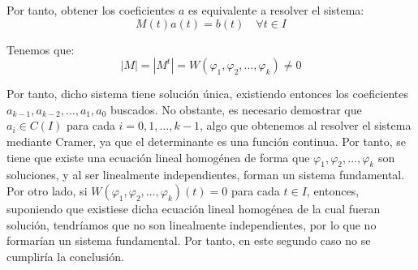 \begin{ejercicio}
    Por tanto, obtener los coeficientes $a$ es equivalente a resolver el sistema:
    \begin{equation*}
        M(t)a(t)=b(t) \quad \forall t\in I
    \end{equation*}

    Tenemos que:
    \begin{equation*}
        |M|=|M^t|=W(\varphi_1,\varphi_2,\ldots,\varphi_k)\neq 0
    \end{equation*}

    Por tanto, dicho sistema tiene solución única, existiendo entonces los coeficientes $a_{k-1},a_{k-2},\ldots,a_1,a_0$ buscados.
    No obstante, es necesario demostrar que $a_i\in C(I)$ para cada $i=0,1,\ldots,k-1$, algo que obtenemos al resolver el sistema mediante Cramer, ya que el determinante es una función continua.
    Por tanto, se tiene que existe una ecuación lineal homogénea de forma que $\varphi_1, \varphi_2, \ldots, \varphi_k$ son soluciones, y al ser linealmente independientes, forman un sistema fundamental.\\

    Por otro lado, si $W(\varphi_1, \varphi_2, \ldots, \varphi_k)(t) = 0$ para cada $t \in I$, entonces, suponiendo que existiese dicha ecuación lineal homogénea de la cual fueran solución, tendríamos que no son linealmente independientes, por lo que no formarían un sistema fundamental.
    Por tanto, en este segundo caso no se cumpliría la conclusión.
\end{ejercicio}

